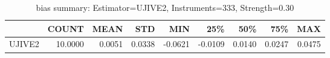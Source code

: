 \begin{table}[ht]
\centering
\caption{bias summary: Estimator=UJIVE2, Instruments=333, Strength=0.30}
\begin{tabular}{lrrrrrrrr}
\toprule
 & COUNT & MEAN & STD & MIN & 25\% & 50\% & 75\% & MAX \\
\midrule
UJIVE2 & 10.0000 & 0.0051 & 0.0338 & -0.0621 & -0.0109 & 0.0140 & 0.0247 & 0.0475 \\
\bottomrule
\end{tabular}
\end{table}
